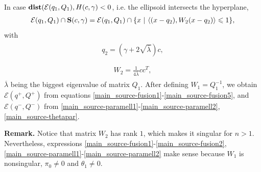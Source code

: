 \documentclass[letterpaper,10pt,english]{sphinxmanual}
\begin{document}
In case ${\bf dist}({\mathcal E}(q_1,Q_1),H(c,\gamma)<0$, i.e. the
ellipsoid intersects the hyperplane,
\begin{gather}
\begin{split}{\mathcal E}(q_1,Q_1)\cap{\bf S}(c,\gamma) =
{\mathcal E}(q_1,Q_1)\cap\{x ~|~ \langle (x-q_2),W_2(x-q_2)\rangle\leqslant1\},\end{split}\notag
\end{gather}
with
\label{main_source:equation-hsell1}\begin{gather}
\begin{split}q_2  =  (\gamma + 2\sqrt{\overline{\lambda}})c,\\\end{split}\label{main_source-hsell1}
\end{gather}\label{main_source:equation-hsell2}\begin{gather}
\begin{split}W_2  =  \frac{1}{4\overline{\lambda}}cc^T,\end{split}\label{main_source-hsell2}
\end{gather}
$\overline{\lambda}$ being the biggest eigenvalue of matrix
$Q_1$. After defining $W_1=Q_1^{-1}$, we obtain
${\mathcal E}(q^+,Q^+)$ from equations \eqref{main_source-fusion1}-\eqref{main_source-fusion5}, and
${\mathcal E}(q^-,Q^-)$ from \eqref{main_source-paramell1}-\eqref{main_source-paramell2},
\eqref{main_source-thetapar}.

\textbf{Remark.} Notice that matrix $W_2$ has rank $1$, which
makes it singular for $n>1$. Nevertheless, expressions
\eqref{main_source-fusion1}-\eqref{main_source-fusion2}, \eqref{main_source-paramell1}-\eqref{main_source-paramell2} make sense because
$W_1$ is nonsingular, $\pi_0\neq0$ and
$\hat{\theta}_1\neq0$.
\end{document}
